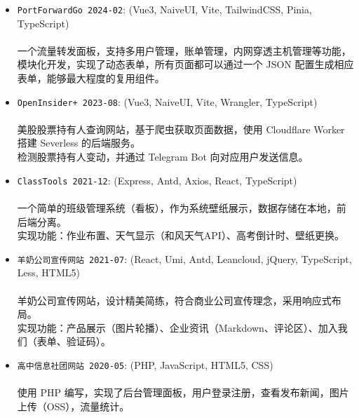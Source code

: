 \documentclass[zh]{resume}
\begin{document}
\begin{itemize}
  \item \texttt{PortForwardGo 2024-02}:
    (Vue3, NaiveUI, Vite, TailwindCSS, Pinia, TypeScript)\\
    \\
    一个流量转发面板，支持多用户管理，账单管理，内网穿透主机管理等功能，
    模块化开发，实现了动态表单，所有页面都可以通过一个 JSON 配置生成相应表单，能够最大程度的复用组件。
  \item \texttt{OpenInsider+ 2023-08}:
    (Vue3, NaiveUI, Vite, Wrangler, TypeScript)\\
    \\
    美股股票持有人查询网站，基于爬虫获取页面数据，使用 Cloudflare Worker 搭建 Severless 的后端服务。\\
    检测股票持有人变动，并通过 Telegram Bot 向对应用户发送信息。
  \item \texttt{ClassTools 2021-12}:
    (Express, Antd, Axios, React, TypeScript)\\
    \\
    一个简单的班级管理系统（看板），作为系统壁纸展示，数据存储在本地，前后端分离。\\
    实现功能：作业布置、天气显示（和风天气API）、高考倒计时、壁纸更换。
  \item \texttt{羊奶公司宣传网站 2021-07}:
    (React, Umi, Antd, Leancloud, jQuery, TypeScript, Less, HTML5)\\
    \\
    羊奶公司宣传网站，设计精美简练，符合商业公司宣传理念，采用响应式布局。\\
    实现功能：产品展示（图片轮播）、企业资讯（Markdown、评论区）、加入我们（表单、验证码）。
  \item \texttt{高中信息社团网站 2020-05}:
    (PHP, JavaScript, HTML5, CSS)\\
    \\
    使用 PHP 编写，实现了后台管理面板，用户登录注册，查看发布新闻，图片上传（OSS），流量统计。
\end{itemize}
\end{document}
